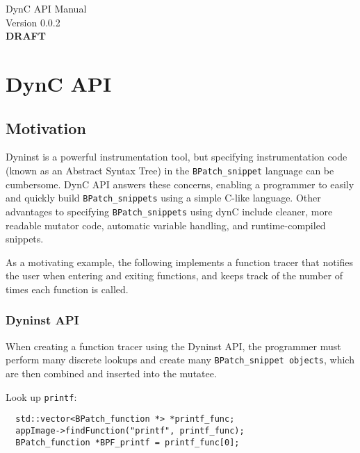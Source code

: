 \documentclass{article}
\begin{document}
\begin{center} \Huge{DynC API Manual} \\
\huge{Version 0.0.2}\\
\vspace{8cm}
\textbf{\Huge{DRAFT}} 
\end{center}
\pagebreak
\tableofcontents
\pagebreak

\section{DynC API}
\subsection{Motivation}
Dyninst is a powerful instrumentation tool, but specifying instrumentation code (known as an Abstract Syntax Tree) in the \verb!BPatch_snippet! language can be cumbersome. DynC API answers these concerns, enabling a programmer to easily and quickly build \verb!BPatch_snippets! using a simple C-like language. Other advantages to specifying \verb!BPatch_snippets! using dynC include cleaner, more readable mutator code, automatic variable handling, and runtime-compiled snippets.

As a motivating example, the following implements a function tracer that notifies the user when entering and exiting functions, and keeps track of the number of times each function is called.

\subsubsection{Dyninst API}
When creating a function tracer using the Dyninst API, the programmer must perform many discrete lookups and create many \verb!BPatch_snippet objects!, which are then combined and inserted into the mutatee.

\vspace{0.5cm}


\lstset{basicstyle=\small, showstringspaces=false, stringstyle=\ttfamily}

\noindent Look up \verb!printf!:
\begin{lstlisting}
  std::vector<BPatch_function *> *printf_func;
  appImage->findFunction("printf", printf_func);
  BPatch_function *BPF_printf = printf_func[0];
\end{lstlisting}
\end{document}
